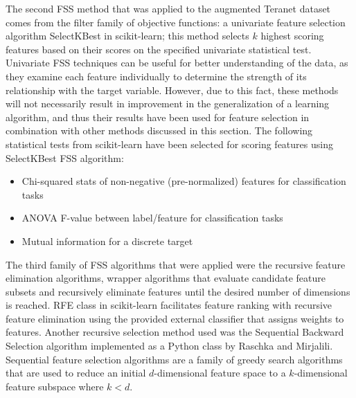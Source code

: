 The second FSS method that was applied to the augmented Teranet dataset comes from the filter family of objective functions: a univariate feature selection algorithm SelectKBest in scikit-learn;
this method selects $k$ highest scoring features based on their scores on the specified univariate statistical test.
Univariate FSS techniques can be useful for better understanding of the data, as they examine each feature individually to determine the strength of its relationship with the target variable.
However, due to this fact, these methods will not necessarily result in improvement in the generalization of a learning algorithm, and thus their results have been used for feature selection in combination with other methods discussed in this section.
The following statistical tests from scikit-learn have been selected for scoring features using SelectKBest FSS algorithm:

\begin{itemize}
    \item Chi-squared stats of non-negative (pre-normalized) features for classification tasks
    \item ANOVA F-value between label/feature for classification tasks
    \item Mutual information for a discrete target
\end{itemize}

The third family of FSS algorithms that were applied were the recursive feature elimination algorithms, wrapper algorithms that evaluate candidate feature subsets and recursively eliminate features until the desired number of dimensions is reached.
RFE class in scikit-learn facilitates feature ranking with recursive feature elimination using the provided external classifier that assigns weights to features.
Another recursive selection method used was the Sequential Backward Selection algorithm implemented as a Python class by Raschka and Mirjalili\cite{RaschkaMirjalili2017}.
Sequential feature selection algorithms are a family of greedy search algorithms that are used to reduce an initial $d$-dimensional feature space to a $k$-dimensional feature subspace where $k<d$.

